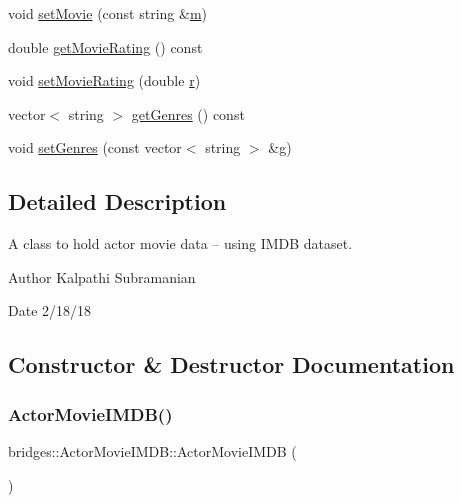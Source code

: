 \begin{DoxyCompactItemize}
\item 
void \mbox{\hyperlink{classbridges_1_1_actor_movie_i_m_d_b_ae773ef3fc7ae370d4ab2bc1aeac60a9a}{set\+Movie}} (const string \&\mbox{\hyperlink{namespacebridges_acfb0a4f7877d8f63de3e6862004c50eda6f8f57715090da2632453988d9a1501b}{m}})
\item 
double \mbox{\hyperlink{classbridges_1_1_actor_movie_i_m_d_b_a8ab7caed7d36c1d371ff9f645db9bfe0}{get\+Movie\+Rating}} () const
\item 
void \mbox{\hyperlink{classbridges_1_1_actor_movie_i_m_d_b_aea16db5315526ff31a1685c08390cdc7}{set\+Movie\+Rating}} (double \mbox{\hyperlink{namespacebridges_acfb0a4f7877d8f63de3e6862004c50eda4b43b0aee35624cd95b910189b3dc231}{r}})
\item 
vector$<$ string $>$ \mbox{\hyperlink{classbridges_1_1_actor_movie_i_m_d_b_a743646c44f7386901accdb12cbce88c2}{get\+Genres}} () const
\item 
void \mbox{\hyperlink{classbridges_1_1_actor_movie_i_m_d_b_acae015a46ec88155ca159974f29ba234}{set\+Genres}} (const vector$<$ string $>$ \&\mbox{\hyperlink{namespacebridges_acfb0a4f7877d8f63de3e6862004c50edab2f5ff47436671b6e533d8dc3614845d}{g}})
\end{DoxyCompactItemize}


\subsection{Detailed Description}
A class to hold actor movie data -- using I\+M\+DB dataset. 

\begin{DoxyAuthor}{Author}
Kalpathi Subramanian 
\end{DoxyAuthor}
\begin{DoxyDate}{Date}
2/18/18 
\end{DoxyDate}


\subsection{Constructor \& Destructor Documentation}
\mbox{\label{classbridges_1_1_actor_movie_i_m_d_b_acd1db3914821a79a7d8fb506151d36a4}} 
\subsubsection{\texorpdfstring{ActorMovieIMDB()}{ActorMovieIMDB()}\hspace{0.1cm}{\footnotesize\ttfamily [1/3]}}
{\footnotesize\ttfamily bridges\+::\+Actor\+Movie\+I\+M\+D\+B\+::\+Actor\+Movie\+I\+M\+DB (\begin{DoxyParamCaption}{ }\end{DoxyParamCaption})\hspace{0.3cm}{\ttfamily [inline]}}

